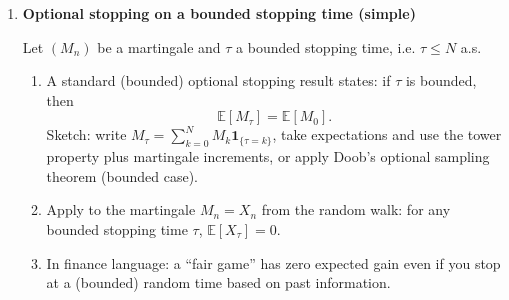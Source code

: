 \documentclass[11pt]{article}
\begin{document}
\begin{enumerate}
Here $S_0=100$ and $S_1\in\{120,90\}$, with risk-free rate $r=0$.

\begin{enumerate}
\item Under a risk-neutral measure $\mathbb{Q}$, discounted prices are martingales. Since $r=0$, discounting is $1$ and we require
\[
\mathbb{E}^{\mathbb{Q}}[S_1]=S_0.
\]
Let $q=\mathbb{Q}(S_1=120)$. Then $\mathbb{Q}(S_1=90)=1-q$ and
\[
100 = 120q+90(1-q)=90+30q \quad\Rightarrow\quad q=\frac{10}{30}=\frac13.
\]
Thus $\boxed{q=1/3}$.

\item The payoff is $H=(S_1-100)_+$, so $H=20$ in the up state and $H=0$ in the down state. Hence
\[
V_0=\mathbb{E}^{\mathbb{Q}}[H]=20\cdot q+0\cdot(1-q)=20\cdot\frac13=\frac{20}{3}.
\]

\item Replication: find $(\Delta,B)$ such that $\Delta S_1+B=H$ in both states:
\[
120\Delta+B=20,\qquad 90\Delta+B=0.
\]
Subtract: $30\Delta=20$ so $\Delta=2/3$. Then $B=-90\Delta=-60$.
Initial cost is $\Delta S_0+B=\frac23\cdot 100-60=\frac{200}{3}-\frac{180}{3}=\frac{20}{3}$, matching $V_0$.
\end{enumerate}

\bigskip

\item \textbf{Optional stopping on a bounded stopping time (simple)}

Let $(M_n)$ be a martingale and $\tau$ a bounded stopping time, i.e. $\tau\le N$ a.s.

\begin{enumerate}
\item A standard (bounded) optional stopping result states:
if $\tau$ is bounded, then
\[
\mathbb{E}[M_\tau]=\mathbb{E}[M_0].
\]
Sketch: write $M_\tau=\sum_{k=0}^N M_k\mathbf{1}_{\{\tau=k\}}$, take expectations and use the tower property plus martingale increments, or apply Doob's optional sampling theorem (bounded case).

\item Apply to the martingale $M_n=X_n$ from the random walk: for any bounded stopping time $\tau$, $\mathbb{E}[X_\tau]=0$.

\item In finance language: a ``fair game'' has zero expected gain even if you stop at a (bounded) random time based on past information.
\end{enumerate}

\end{enumerate}
\end{document}
